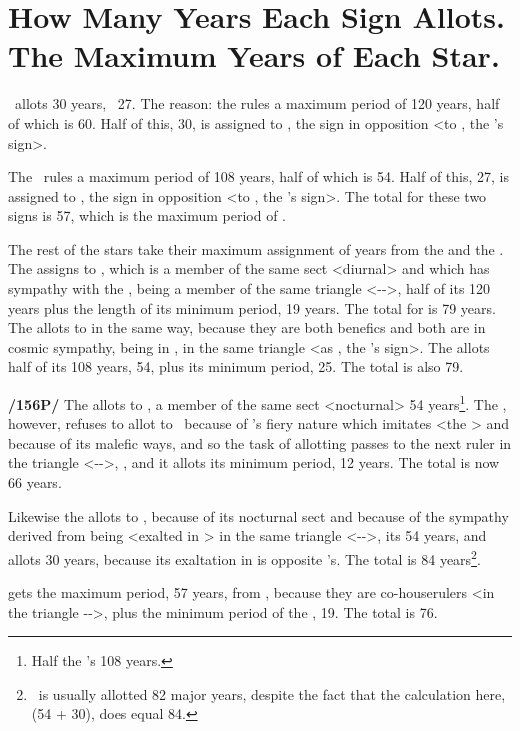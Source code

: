 \section{How Many Years Each Sign Allots. The Maximum Years of Each Star.}

\Aquarius\, allots 30 years, \Capricorn\, 27. The reason: the \Sun\xspace rules a maximum period of 120 years,
half of which is 60. Half of this, 30, is assigned to \Aquarius, the sign in opposition <to \Leo, the \Sun’s
sign>. 

The \Moon\, rules a maximum period of 108 years, half of which is 54. Half of this, 27, is assigned to \Capricorn, the sign in opposition <to \Cancer, the \Moon’s sign>. The total for these two signs is 57, which is the maximum period of \Saturn.

The rest of the stars take their maximum assignment of years from the \Sun\xspace and the \Moon. The \Sun\xspace assigns to \Jupiter, which is a member of the same sect <diurnal> and which has sympathy with the \Sun, being a member of the same triangle <\Leo-\Sagittarius-\Aries>, half of its 120 years plus the length of its minimum period, 19 years. The total for \Jupiter\xspace is 79 years. The \Moon\xspace allots to \Jupiter\xspace in the same way, because they are both benefics and both are in cosmic sympathy, \Jupiter\xspace being in \Pisces, in the same triangle <as \Cancer, the \Moon’s sign>. The \Moon\xspace allots half of its 108 years, 54, plus its minimum period, 25. The total is also 79.

\textbf{/156P/} The \Moon\xspace allots to \Mars, a member of the same sect <nocturnal> 54 years\footnote{Half the \Moon's 108 years.}. The \Sun, however,
refuses to allot to \Mars\, because of \Mars’s fiery nature which imitates <the \Sun> and because of its malefic
ways, and so the task of allotting passes to the next ruler in the triangle <\Leo-\Sagittarius-\Aries>, \Jupiter, and it allots its minimum period, 12 years. The total is now 66 years.

Likewise the \Moon\xspace allots to \Venus, because of its nocturnal sect and because of the sympathy derived from being <exalted in \Pisces> in the same triangle <\Cancer-\Pisces-\Scorpio>, its 54 years, and \Saturn\xspace allots 30 years, because its exaltation in \Libra\xspace is opposite \Venus’s. The total is 84 years\footnote{\Venus\, is usually allotted 82 major years, despite the fact that the calculation here, (54 + 30), does equal 84.}.

\Mercury\xspace gets the maximum period, 57 years, from \Saturn, because they are co-houserulers <in the triangle \Virgo-\Capricorn-\Taurus>, plus the minimum period of the \Sun, 19. The total is 76.

\newpage